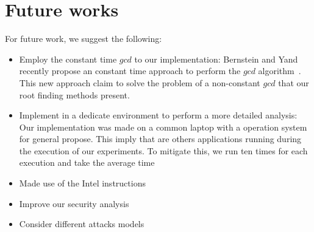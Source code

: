 \section{Future works}
For future work, we suggest the following:

\begin{itemize}
    \item Employ the constant time $gcd$ to our implementation: Bernstein and Yand recently propose an constant time approach to perform the $gcd$ algorithm~\cite{Bernstein_Yang_2019}. This new approach claim to solve the problem of a non-constant $gcd$ that our root finding methods present. 
    \item Implement in a dedicate environment to perform a more detailed analysis: Our implementation was made on a common laptop with a operation system for general propose. This imply that are others applications running during the execution of our experiments. To mitigate this, we run ten times for each execution and take the average time
    \item Made use of the Intel instructions
    \item Improve our security analysis
    \item Consider different attacks models
\end{itemize}